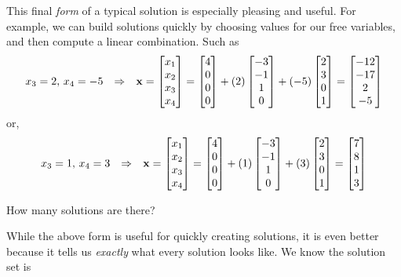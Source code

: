 \documentclass{ximera}
\begin{document}
\begin{example}
  This final \textit{form} of a typical solution is especially
  pleasing and useful.  For example, we can build solutions quickly by
  choosing values for our free variables, and then compute a linear
  combination.  Such as
  \begin{align*}
    x_3=2,\,x_4=-5&&\Rightarrow&&
                                  \mathbf{x}=\begin{bmatrix}x_1\\x_2\\x_3\\x_4\end{bmatrix}=
    \begin{bmatrix}4\\0\\0\\0\end{bmatrix}+(2)\begin{bmatrix}-3\\-1\\1\\0\end{bmatrix}+(-5)\begin{bmatrix}2\\3\\0\\1\end{bmatrix}
    =\begin{bmatrix}-12\\-17\\2\\-5\end{bmatrix}
    \end{align*}
    or,
    \begin{align*}
      x_3=1,\,x_4=3&&\Rightarrow&&
                                   \mathbf{x}=\begin{bmatrix}x_1\\x_2\\x_3\\x_4\end{bmatrix}=
      \begin{bmatrix}4\\0\\0\\0\end{bmatrix}+(1)\begin{bmatrix}-3\\-1\\1\\0\end{bmatrix}+(3)\begin{bmatrix}2\\3\\0\\1\end{bmatrix}
      =\begin{bmatrix}7\\8\\1\\3\end{bmatrix}
  \end{align*}
  
  \begin{question}
    How many solutions are there?

    While the above form is useful for quickly creating solutions, it
    is even better because it tells us \textit{exactly} what every
    solution looks like.  We know the solution set is 
    \begin{multipleChoice}
      \end{multipleChoice}


\end{question}
\end{example}
\end{document}
